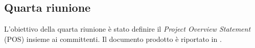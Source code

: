 \subsection{Quarta riunione}
\label{sec:quarta-riunione}

L'obiettivo della quarta riunione è stato definire il \emph{Project Overview Statement} (POS) insieme ai committenti.
Il documento prodotto è riportato in .
